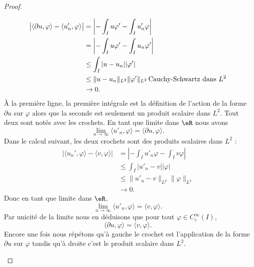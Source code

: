 \begin{proof}
\begin{enumerate}
\begin{subequations}
\begin{align}
                \big| \langle \partial u, \varphi\rangle -\langle u_n', \varphi\rangle  \big|&=\left| -\int_Iu\varphi'-\int_Iu'_n\varphi \right| \\
                &=\left| -\int_Iu\varphi'-\int_Iu_n\varphi' \right| \\
            &\leq \int_I| u-u_n | |\varphi' |\\
            &\leq\| u-u_n \|_{L^2}\| \varphi' \|_{L^2}\,\text{Cauchy-Schwartz dans \( L^2\)}\\
            &\to 0.
                \end{align}
            \end{subequations}
            À la première ligne, la première intégrale est la définition de l'action de la forme \( \partial u\) sur \( \varphi\) alors que la seconde est seulement un produit scalaire dans \( L^2\). Tout deux sont notés avec les crochets. En tant que limite dans \( \eR\) nous avons
            \begin{equation}
                \lim_{n\to \infty} \langle u'_n, \varphi\rangle =\langle \partial u, \varphi\rangle .
            \end{equation}
            Dans le calcul suivant, les deux crochets sont des produits scalaires dans \( L^2\) :
            \begin{subequations}
                \begin{align}
                \big| \langle u_n', \varphi\rangle -\langle v, \varphi\rangle  \big|&=\left| -\int_Iu'_n\varphi-\int_Iv\varphi \right| \\
            &\leq \int_I| u'_n-v| |\varphi |\\
            &\leq\| u'_n-v \|_{L^2}\| \varphi \|_{L^2}\\
            &\to 0.
                \end{align}
            \end{subequations}
            Donc en tant que limite dans \( \eR\),
            \begin{equation}
                \lim_{n\to \infty} \langle u'_n, \varphi\rangle =\langle v, \varphi\rangle .
            \end{equation}
            Par unicité de la limite nous en déduisons que pour tout \( \varphi\in C^{\infty}_c(I)\),
            \begin{equation}
                \langle \partial u, \varphi\rangle =\langle v, \varphi\rangle .
            \end{equation}
            Encore une fois nous répétons qu'à gauche le crochet est l'application de la forme \( \partial u\) sur \( \varphi\) tandis qu'à droite c'est le produit scalaire dans \( L^2\). 


\end{enumerate}
\end{proof}
